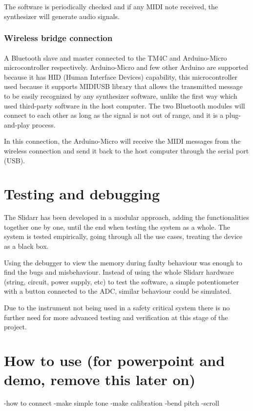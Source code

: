 \documentclass{article}
\begin{document}
The software is periodically checked and if any MIDI note received, the synthesizer will generate audio signals.

\subsubsection{Wireless bridge connection}
\paragraph{}A Bluetooth slave and master connected to the TM4C and Arduino-Micro microcontroller respectively. Arduino-Micro and few other Arduino are supported because it has HID (Human Interface Devices) capability, this microcontroller used because it supports MIDIUSB library \cite{arduinolibraries} that allows the transmitted message to be easily recognized by any synthesizer software, unlike the first way which used third-party software in the host computer. The two Bluetooth modules will connect to each other as long as the signal is not out of range, and it is a plug-and-play process.

In this connection, the Arduino-Micro will receive the MIDI messages from the wireless connection and send it back to the host computer through the serial port (USB). 

\section{Testing and debugging}
The Slidarr has been developed in a modular approach, adding the functionalities together one by one, until the end when testing the system as a whole. The system is tested empirically, going through all the use cases, treating the device as a black box.

Using the debugger to view the memory during faulty behaviour was enough to find the bugs and misbehaviour. Instead of using the whole Slidarr hardware (string, circuit, power supply, etc) to test the software, a simple potentiometer with a button connected to the ADC, similar behaviour could be simulated.

Due to the instrument not being used in a safety critical system there is no further need for more advanced testing and verification at this stage of the project.

\section{How to use (for powerpoint and demo, remove this later on)}
-how to connect
-make simple tone
-make calibration
-bend pitch
-scroll
\end{document}
